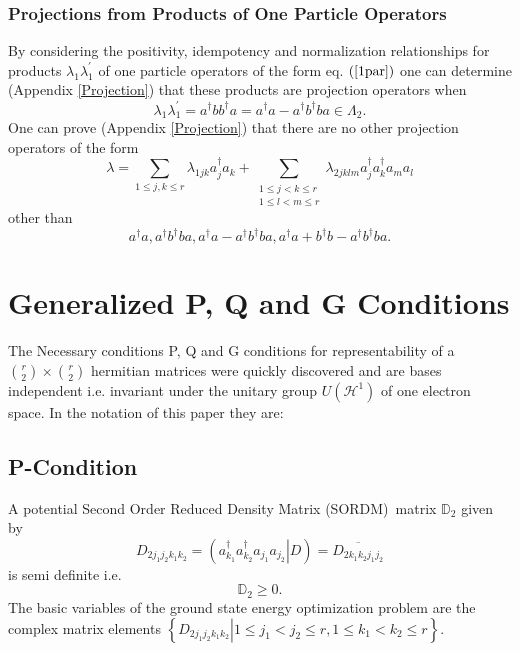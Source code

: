 \documentclass[aps,preprint]{revtex4}%
\begin{document}
\subsubsection{Projections from Products of One Particle Operators}

By considering the positivity, idempotency and normalization relationships for
products $\lambda_{1}\lambda_{1}^{\prime}$ of one particle operators of the
form eq. $\left(  \ref{1par}\right)  $ one can determine (Appendix
\ref{Projection}) that these products are projection operators when
\begin{equation}
\lambda_{1}\lambda_{1}^{\prime}=a^{\dagger}bb^{\dagger}a=a^{\dagger
}a-a^{\dagger}b^{\dagger}ba\in\Lambda_{2}.
\end{equation}
One can prove (Appendix \ref{Projection}) that there are no other projection
operators of the form
\begin{equation}
\lambda=\sum_{1\leq j,k\leq r}\lambda_{1jk}a_{j}^{\dagger}a_{k}+\sum
_{\substack{1\leq j<k\leq r\\1\leq l<m\leq r}}\lambda_{2jklm}a_{j}^{\dagger
}a_{k}^{\dagger}a_{m}a_{l}%
\end{equation}
other than
\begin{equation}
a^{\dagger}a,a^{\dagger}b^{\dagger}ba,a^{\dagger}a-a^{\dagger}b^{\dagger
}ba,a^{\dagger}a+b^{\dagger}b-a^{\dagger}b^{\dagger}ba.
\end{equation}


\section{Generalized P, Q and G Conditions \label{PQG}}

The Necessary conditions P, Q and G conditions for representability of a
$\binom{r}{2}\times\binom{r}{2}$ hermitian matrices were quickly discovered
\cite{PQG} and are bases independent i.e. invariant under the unitary group
$U\left(  \mathcal{H}^{1}\right)  $ of one electron space. In the notation of
this paper they are:

\subsection{P-Condition}

A potential Second Order Reduced Density Matrix (SORDM)\ matrix $\mathbb{D}%
_{2}$ given by
\begin{equation}
D_{2j_{1}j_{2}k_{1}k_{2}}=\left(  \left.  a_{k_{1}}^{\dagger}a_{k_{2}%
}^{\dagger}a_{j_{1}}a_{j_{2}}\right\vert D\right)  =\overline{D_{2k_{1}%
k_{2}j_{1}j_{2}}}%
\end{equation}
is semi definite i.e.
\begin{equation}
\mathbb{D}_{2}\geq0.
\end{equation}
The basic variables of the ground state energy optimization problem are the
complex matrix elements $\left\{  \left.  D_{2j_{1}j_{2}k_{1}k_{2}}\right\vert
1\leq j_{1}<j_{2}\leq r,1\leq k_{1}<k_{2}\leq r\right\}  .$
\end{document}
